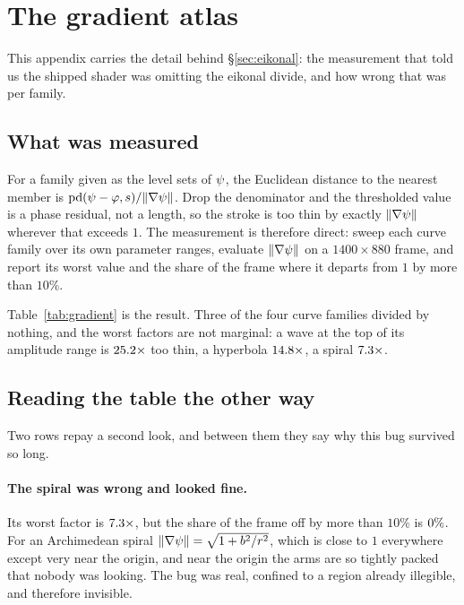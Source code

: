 \section{The gradient atlas}
\label{app:atlas}

This appendix carries the detail behind \S\ref{sec:eikonal}: the measurement that
told us the shipped shader was omitting the eikonal divide, and how wrong that was
per family.

\subsection{What was measured}

For a family given as the level sets of $\psi$, the Euclidean distance to the
nearest member is $\mathrm{pd}(\psi-\varphi,s)/\lVert\nabla\psi\rVert$. Drop the
denominator and the thresholded value is a phase residual, not a length, so the
stroke is too thin by exactly $\lVert\nabla\psi\rVert$ wherever that exceeds $1$.
The measurement is therefore direct: sweep each curve family over its own
parameter ranges, evaluate $\lVert\nabla\psi\rVert$ on a $1400\times880$ frame, and
report its worst value and the share of the frame where it departs from $1$ by
more than $10\%$.



Table~\ref{tab:gradient} is the result. Three of the four curve families divided
by nothing, and the worst factors are not marginal: a wave at the top of its
amplitude range is $25.2\times$ too thin, a hyperbola
$14.8\times$, a spiral $7.3\times$.

\subsection{Reading the table the other way}

Two rows repay a second look, and between them they say why this bug survived so
long.

\paragraph{The spiral was wrong and looked fine.} Its worst factor is
$7.3\times$, but the share of the frame off by more than $10\%$ is
$0\%$. For an Archimedean spiral $\lVert\nabla\psi\rVert=\sqrt{1+b^2/r^2}$, which is
close to $1$ everywhere except very near the origin, and near the origin the
arms are so tightly packed that nobody was looking. The bug was real, confined to
a region already illegible, and therefore invisible.

